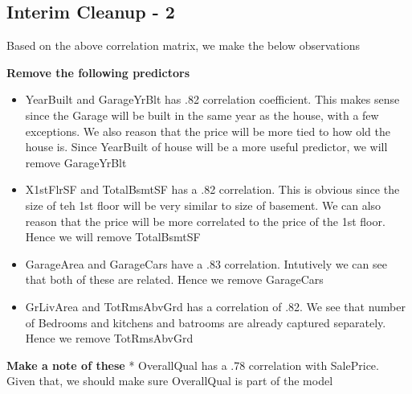 \documentclass[
]{article}
\newenvironment{Shaded}{\begin{snugshade}}{\end{snugshade}}
\newcommand{\DataTypeTok}[1]{\textcolor[rgb]{0.13,0.29,0.53}{#1}}
\newcommand{\KeywordTok}[1]{\textcolor[rgb]{0.13,0.29,0.53}{\textbf{#1}}}
\newcommand{\NormalTok}[1]{#1}
\newcommand{\OperatorTok}[1]{\textcolor[rgb]{0.81,0.36,0.00}{\textbf{#1}}}
\newcommand{\StringTok}[1]{\textcolor[rgb]{0.31,0.60,0.02}{#1}}
\providecommand{\tightlist}{%
  \setlength{\itemsep}{0pt}\setlength{\parskip}{0pt}}
\begin{document}
\hypertarget{interim-cleanup---2}{%
\subsection{Interim Cleanup - 2}\label{interim-cleanup---2}}

Based on the above correlation matrix, we make the below observations

\textbf{Remove the following predictors}

\begin{itemize}
\tightlist
\item
  YearBuilt and GarageYrBlt has .82 correlation coefficient. This makes sense since the Garage will be built in the same year as the house, with a few exceptions. We also reason that the price will be more tied to how old the house is. Since YearBuilt of house will be a more useful predictor, we will remove GarageYrBlt
\item
  X1stFlrSF and TotalBsmtSF has a .82 correlation. This is obvious since the size of teh 1st floor will be very similar to size of basement. We can also reason that the price will be more correlated to the price of the 1st floor. Hence we will remove TotalBsmtSF
\item
  GarageArea and GarageCars have a .83 correlation. Intutively we can see that both of these are related. Hence we remove GarageCars
\item
  GrLivArea and TotRmsAbvGrd has a correlation of .82. We see that number of Bedrooms and kitchens and batrooms are already captured separately. Hence we remove TotRmsAbvGrd
\end{itemize}

\textbf{Make a note of these}
* OverallQual has a .78 correlation with SalePrice. Given that, we should make sure OverallQual is part of the model

\begin{Shaded}
\end{Shaded}
\end{document}
